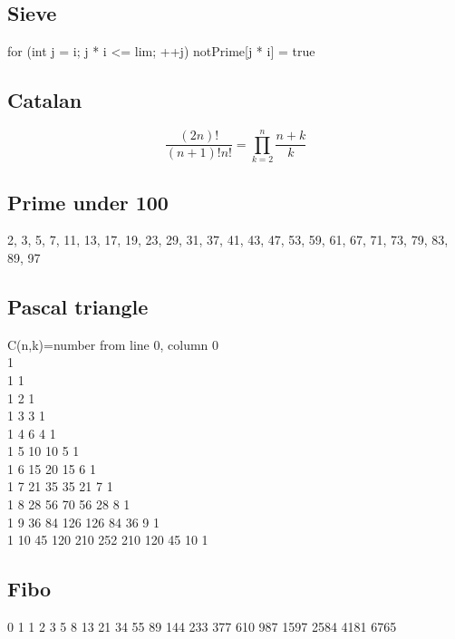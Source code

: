 \documentclass[A4 paper, 12pt, oneside]{article}
\begin{document}
\begin{landscape}
\begin{multicols}{2}
	\subsection{Sieve}
	for (int j = i; j * i <= lim; ++j) notPrime[j * i] = true

	\subsection{Catalan}
	\[\frac{(2n)!}{(n + 1)!n!} = \prod_{k = 2}^n \frac{n + k}{k} \]

	\subsection{Prime under 100}
	2, 3, 5, 7, 11, 13, 17, 19, 23, 29, 31, 37, 41, 43, 47, 53, 59, 61, 67, 71, 73, 79, 83, 89, 97 
	\subsection{Pascal triangle}
C(n,k)=number from line 0, column 0\\
1\\
1 1\\
1 2 1\\ 
1 3 3 1\\ 
1 4 6 4 1\\ 
1 5 10 10 5 1\\ 
1 6 15 20 15 6 1\\ 
1 7 21 35 35 21 7 1\\
1 8 28 56 70 56 28 8 1\\ 
1 9 36 84 126 126 84 36 9 1\\
1 10 45 120 210 252 210 120 45 10 1
	\subsection{Fibo}
	0 1 1 2 3 5 8 13 21 34 55 89 144 233 377 610 987 1597 2584 4181 6765

\end{multicols}
\end{landscape}
\end{document}
